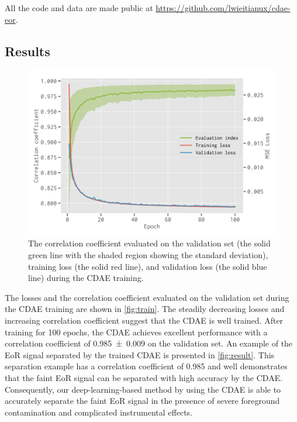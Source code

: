 \documentclass[letters,a4paper,fleqn,usenatbib]{mnras}
\begin{document}
All the code and data are made public at
\url{https://github.com/lwieitianux/cdae-eor}.


\subsection{Results}
\label{sec:results}

\begin{figure}
  \centering
  \includegraphics[width=\columnwidth]{cdae-train}
  \caption{\label{fig:train}%
    The correlation coefficient evaluated on the validation set (the
    solid green line with the shaded region showing the standard
    deviation), training loss (the solid red line), and validation loss
    (the solid blue line) during the CDAE training.
  }
\end{figure}

The losses and the correlation coefficient evaluated on the validation
set during the CDAE training are shown in \autoref{fig:train}.
The steadily decreasing losses and increasing correlation coefficient
suggest that the CDAE is well trained.
After training for 100 epochs, the CDAE achieves excellent performance
with a correlation coefficient of \num{0.985 +- 0.009} on the validation
set.
An example of the EoR signal separated by the trained CDAE is presented
in \autoref{fig:result}.
This separation example has a correlation coefficient of 0.985 and well
demonstrates that the faint EoR signal can be separated with high
accuracy by the CDAE.
Consequently, our deep-learning-based method by using the CDAE is able
to accurately separate the faint EoR signal in the presence of severe
foreground contamination and complicated instrumental effects.
\end{document}
